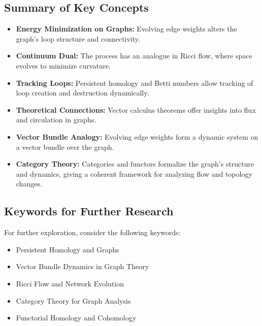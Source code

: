 \documentclass[10pt,a4paper,twocolumn]{article}
\begin{document}
	\subsection{Summary of Key Concepts}
	\begin{itemize}
		\item \textbf{Energy Minimization on Graphs:} Evolving edge weights alters the graph’s loop structure and connectivity.
		\item \textbf{Continuum Dual:} The process has an analogue in Ricci flow, where space evolves to minimize curvature.
		\item \textbf{Tracking Loops:} Persistent homology and Betti numbers allow tracking of loop creation and destruction dynamically.
		\item \textbf{Theoretical Connections:} Vector calculus theorems offer insights into flux and circulation in graphs.
		\item \textbf{Vector Bundle Analogy:} Evolving edge weights form a dynamic system on a vector bundle over the graph.
		\item \textbf{Category Theory:} Categories and functors formalize the graph’s structure and dynamics, giving a coherent framework for analyzing flow and topology changes.
	\end{itemize}
	
	\subsection{Keywords for Further Research}
	For further exploration, consider the following keywords:
	\begin{itemize}
		\item Persistent Homology and Graphs
		\item Vector Bundle Dynamics in Graph Theory
		\item Ricci Flow and Network Evolution
		\item Category Theory for Graph Analysis
		\item Functorial Homology and Cohomology
	\end{itemize}
	
	
	
	
	
	\clearpage
	\onecolumn
	
	
	\twocolumn
	
\end{document}
